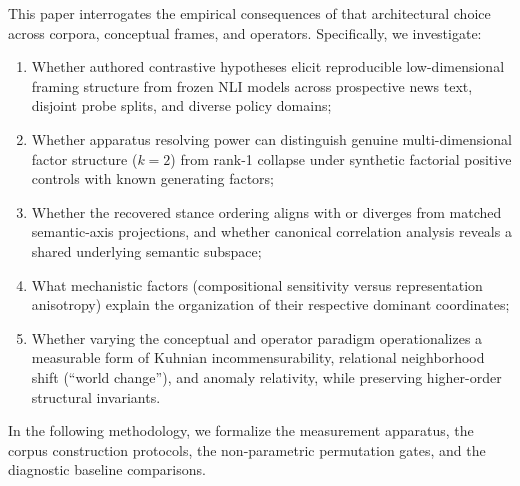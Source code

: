 This paper interrogates the empirical consequences of that architectural choice across corpora, conceptual frames, and operators. Specifically, we investigate:
\begin{enumerate}
    \item Whether authored contrastive hypotheses elicit reproducible low-dimensional framing structure from frozen NLI models across prospective news text, disjoint probe splits, and diverse policy domains;
    \item Whether apparatus resolving power can distinguish genuine multi-dimensional factor structure ($k=2$) from rank-1 collapse under synthetic factorial positive controls with known generating factors;
    \item Whether the recovered stance ordering aligns with or diverges from matched semantic-axis projections, and whether canonical correlation analysis reveals a shared underlying semantic subspace;
    \item What mechanistic factors (compositional sensitivity versus representation anisotropy) explain the organization of their respective dominant coordinates;
    \item Whether varying the conceptual and operator paradigm operationalizes a measurable form of Kuhnian incommensurability, relational neighborhood shift (``world change''), and anomaly relativity, while preserving higher-order structural invariants.
\end{enumerate}
In the following methodology, we formalize the measurement apparatus, the corpus construction protocols, the non-parametric permutation gates, and the diagnostic baseline comparisons.
